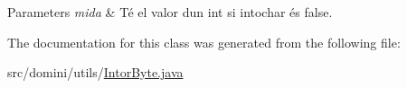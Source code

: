 \begin{DoxyParams}{Parameters}
{\em mida} & Té el valor d\textquotesingle{}un int si intochar és false. \\
\hline
\end{DoxyParams}


The documentation for this class was generated from the following file\+:\begin{DoxyCompactItemize}
\item 
src/domini/utils/\hyperlink{IntorByte_8java}{Intor\+Byte.\+java}\end{DoxyCompactItemize}

